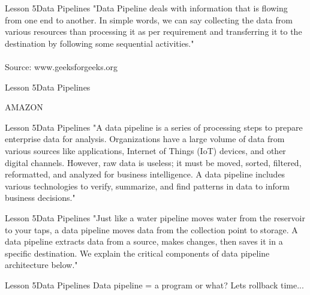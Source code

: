 \documentclass[aspectratio=1610]{beamer}
\begin{document}
\begin{frame}{Lesson 5}{Data Pipelines}
\LARGE
"Data Pipeline deals with information that is flowing from one end to 
another. In simple words, we can say collecting the data from various 
resources than processing it as per requirement and transferring it 
to the destination by following some sequential activities."\\~\\
Source: www.geeksforgeeks.org
\end{frame}

\begin{frame}
\end{frame}


\begin{frame}{Lesson 5}{Data Pipelines}
\Huge
\begin{center}
AMAZON
\end{center}
\end{frame}


\begin{frame}{Lesson 5}{Data Pipelines}
\LARGE
"A data pipeline is a series of processing steps to prepare 
enterprise data for analysis. Organizations have a large volume of 
data from various sources like applications, Internet of Things (IoT)
devices, and other digital channels. However, raw data is useless; it
must be moved, sorted, filtered, reformatted, and analyzed for
business intelligence. A data pipeline includes various technologies
to verify, summarize, and find patterns in data to inform business 
decisions."
\end{frame}


\begin{frame}{Lesson 5}{Data Pipelines}
\LARGE
"Just like a water pipeline moves water from the reservoir to your
taps, a data pipeline moves data from the collection point to
storage. A data pipeline extracts data from a source, makes changes,
then saves it in a specific destination. We explain the critical
components of data pipeline architecture below."
\end{frame}


\begin{frame}
\end{frame}


\begin{frame}{Lesson 5}{Data Pipelines}
\Huge
 Data pipeline = a program or what? Lets rollback time... 
 \end{frame}
\end{document}
